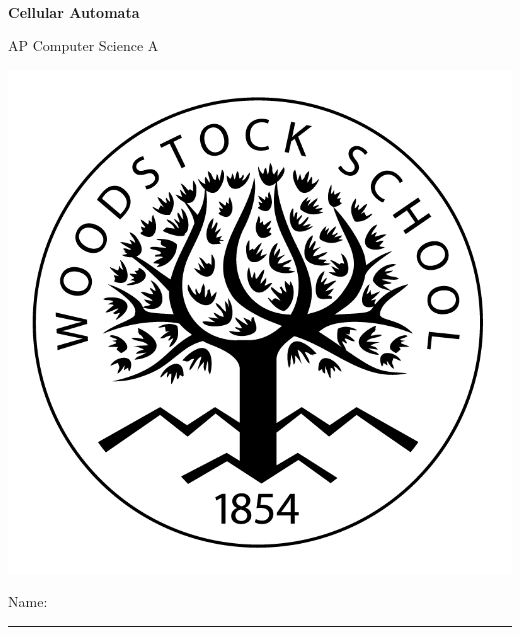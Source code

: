 
\usepackage{tikz}
\usetikzlibrary{matrix, positioning}

\def\LabCourse{AP Computer Science A}
\def\LabNumber{03}
\def\LabTitle{Cellular Automata}

\newcommand\QBlankBox[1]{
\stepcounter{QuestionCounter}
\colorbox{black!10}{\parbox{0.9875\textwidth}{
  \raggedright
  \textbf{Question \#\theQuestionCounter:} #1
}}
}


	\begin{coverpages}
		\ \\[2cm]
		\begin{center}
			\huge
			\textbf{\LabTitle}

			\Large
			\LabCourse
		\end{center}

		\vspace{1.5cm}

		\begin{center}
			\includegraphics[scale=0.45]{graphics/logo_black}

			\vspace{2.5cm}

			\Large
			Name: \rule{11.5cm}{0.1pt}
		\end{center}
	\end{coverpages}

	\blankpage

